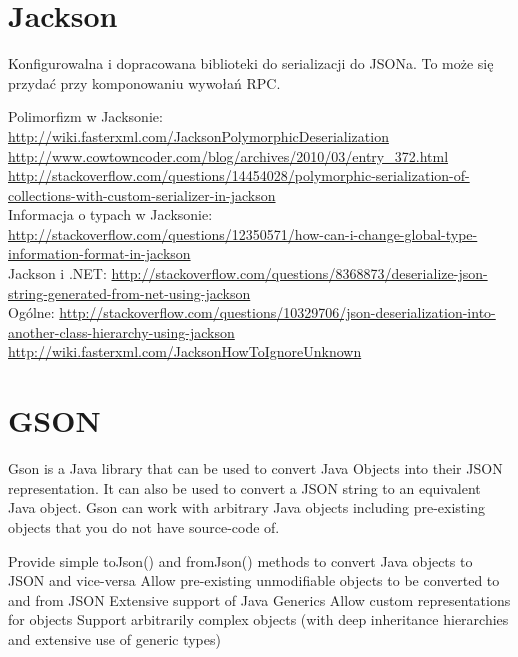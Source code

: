 \section{Jackson}
Konfigurowalna i dopracowana biblioteki do serializacji do JSONa. To może się przydać przy komponowaniu wywołań RPC.

Polimorfizm w Jacksonie:
\url{http://wiki.fasterxml.com/JacksonPolymorphicDeserialization}\\
\url{http://www.cowtowncoder.com/blog/archives/2010/03/entry_372.html}\\
\url{http://stackoverflow.com/questions/14454028/polymorphic-serialization-of-collections-with-custom-serializer-in-jackson}\\

Informacja o typach w Jacksonie:
\url{http://stackoverflow.com/questions/12350571/how-can-i-change-global-type-information-format-in-jackson}\\

Jackson i .NET:
\url{http://stackoverflow.com/questions/8368873/deserialize-json-string-generated-from-net-using-jackson}\\

Ogólne:
\url{http://stackoverflow.com/questions/10329706/json-deserialization-into-another-class-hierarchy-using-jackson}\\
\url{http://wiki.fasterxml.com/JacksonHowToIgnoreUnknown}\\



\section{GSON}
Gson is a Java library that can be used to convert Java Objects into their JSON representation. It can also be used to convert a JSON string to an equivalent Java object. Gson can work with arbitrary Java objects including pre-existing objects that you do not have source-code of.

Provide simple toJson() and fromJson() methods to convert Java objects to JSON and vice-versa
Allow pre-existing unmodifiable objects to be converted to and from JSON
Extensive support of Java Generics
Allow custom representations for objects
Support arbitrarily complex objects (with deep inheritance hierarchies and extensive use of generic types)



